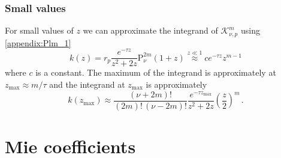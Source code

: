 \documentclass[superscriptaddress,prb]{revtex4-1}
\newcommand{\e}{e}    %
\newcommand{\Plm}[2]{{\text{P}_{#1}^{#2}}}
\newcommand{\tmax}{{\text{max}}}
\begin{document}
\subsubsection{Small values}
For small values of $z$ we can approximate the integrand of
$\mathcal{K}_{\nu,p}^m$ using \eqref{appendix:Plm_1}
\begin{equation}
k(z) = r_p \frac{\e^{-\tau z}}{z^2+2z} \Plm{\nu}{2m}(1+z) \overset{z \ll 1}{\approx} c \e^{-\tau z} z^{m-1}
\end{equation}
where $c$ is a constant. The maximum of the integrand is approximately at $z_\tmax \approx m/\tau$ and the
integrand at $z_\tmax$ is approximately
\begin{equation}
k(z_\tmax) \approx \frac{(\nu+2m)!}{(2m)! \, (\nu-2m)!} \frac{\e^{-\tau z_\tmax}}{z^2+2z} \left(\frac{z}{2}\right)^m \,.
\end{equation}


\section{Mie coefficients}
\end{document}
